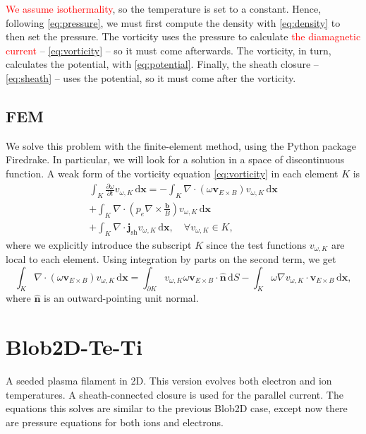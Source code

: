 \documentclass{article}
\begin{document}
\textcolor{red}{We assume isothermality}, so the temperature is set to a constant. Hence, following \cref{eq:pressure}, we must first compute the density with \cref{eq:density} to then set the pressure. The vorticity uses the pressure to calculate \textcolor{red}{the diamagnetic current} -- \cref{eq:vorticity} -- so it must come afterwards. The vorticity, in turn, calculates the potential, with \cref{eq:potential}. Finally, the sheath closure -- \cref{eq:sheath} -- uses the potential, so it must come after the vorticity.

\subsection{FEM}

We solve this problem with the finite-element method, using the Python package Firedrake. In particular, we will look for a solution in a space of discontinuous function. A weak form of the vorticity equation \cref{eq:vorticity} in each element $K$ is
%
\begin{multline}
    \int_K \frac{\partial \omega}{\partial t} v_{\omega,K} \, \mathrm{d}\bm{x} = - \int_K \nabla \cdot \left( \omega \bm{v}_{E \times B} \right) v_{\omega,K} \, \mathrm{d}\bm{x} \\
    + \int_K \nabla \cdot \left( p_e \nabla \times \frac{\bm{b}}{B} \right) v_{\omega,K} \, \mathrm{d}\bm{x} \\
    + \int_K \nabla \cdot \bm{j}_\text{sh} v_{\omega,K} \, \mathrm{d}\bm{x} , \quad \forall v_{\omega,K} \in K ,
\end{multline}
%
where we explicitly introduce the subscript $K$ since the test functions $v_{\omega,K}$ are local to each element. Using integration by parts on the second term, we get
%
\begin{equation}
    \int_K \nabla \cdot (\omega \bm{v}_{E \times B}) v_{\omega,K} \, \mathrm{d}\bm{x} = \int_{\partial K} v_{\omega,K} \omega \bm{v}_{E \times B} \cdot \hat{\bm{n}} \, \mathrm{d}S - \int_K \omega \nabla v_{\omega,K} \cdot \bm{v}_{E \times B} \, \mathrm{d}\bm{x} ,
\end{equation}
%
where $\hat{\bm{n}}$ is an outward-pointing unit normal.

\newpage

\section{Blob2D-Te-Ti}

A seeded plasma filament in 2D. This version evolves both electron and ion temperatures. A sheath-connected closure is used for the parallel current. The equations this solves are similar to the previous Blob2D case, except now there are pressure equations for both ions and electrons.
\end{document}
